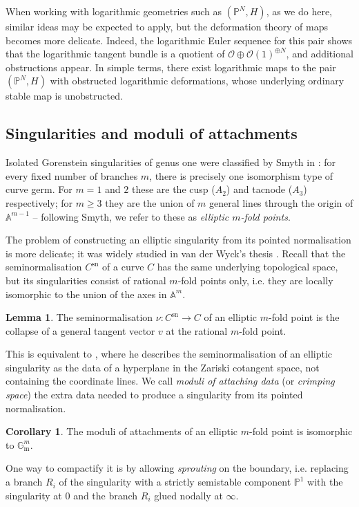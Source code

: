 \documentclass[11pt]{amsart}
\newcommand{\PP}{\mathbb P}
\renewcommand{\to}{\rightarrow}
\newcommand{\Aaff}{\mathbb{A}}
\theoremstyle{definition}
\newtheorem{lemma}[thm]{Lemma}
\newtheorem{cor}[thm]{Corollary}
\theoremstyle{definition}
\begin{document}
When working with logarithmic geometries such as $(\mathbb P^N,H)$, as we do here, similar ideas may be expected to apply, but the deformation theory of maps becomes more delicate. Indeed, the logarithmic Euler sequence for this pair shows that the logarithmic tangent bundle is a quotient of $\mathcal O\oplus\mathcal O(1)^{\oplus N}$, and additional obstructions appear. In simple terms, there exist logarithmic maps to the pair $(\mathbb P^N,H)$ with obstructed logarithmic deformations, whose underlying ordinary stable map is unobstructed. 

\subsection{Singularities and moduli of attachments}\label{S:ellsing} Isolated Gorenstein singularities of genus one were classified by Smyth in \cite{SMY1}: for every fixed number of branches $m$, there is precisely one isomorphism type of curve germ. For $m=1$ and $2$ these are the cusp ($A_2$) and tacnode ($A_3$) respectively; for $m\geq 3$ they are the union of $m$ general lines through the origin of $\Aaff^{m-1}$ -- following Smyth, we refer to these as \emph{elliptic $m$-fold points}.

The problem of constructing an elliptic singularity from its pointed normalisation is more delicate; it was widely studied in van der Wyck's thesis \cite{vdW}. Recall that the seminormalisation $C^\text{sn}$ of a curve $C$ has the same underlying topological space, but its singularities consist of rational $m$-fold points only, i.e. they are locally isomorphic to the union of the axes in $\Aaff^m$.

\begin{lemma}\label{lem:pushout}
 The seminormalisation $\nu\colon C^\text{sn}\to C$ of an elliptic $m$-fold point is the collapse of a general tangent vector $v$ at the rational $m$-fold point.
\end{lemma}

This is equivalent to \cite[Lemma 2.2]{SMY1}, where he describes the seminormalisation of an elliptic singularity as the data of a hyperplane in the Zariski cotangent space, not containing the coordinate lines. We call \emph{moduli of attaching data} \cite[\S 2.2]{SMY2} (or \emph{crimping space}) the extra data needed to produce a singularity from its pointed normalisation.

\begin{cor}
 The moduli of attachments of an elliptic $m$-fold point is isomorphic to $\mathbb G_{\text{m}}^m$.
\end{cor}
One way to compactify it is by allowing \emph{sprouting} on the boundary, i.e. replacing a branch $R_i$ of the singularity with a strictly semistable component $\PP^1$ with the singularity at $0$ and the branch $R_i$ glued nodally at $\infty$.
\end{document}
